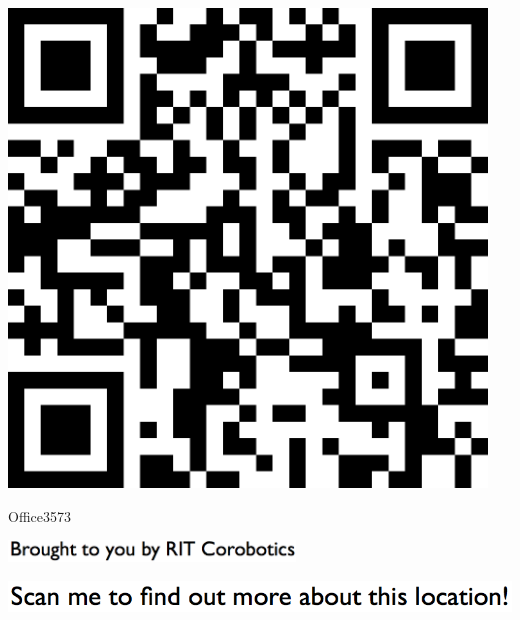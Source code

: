 \documentclass[letterpaper]{article}
\begin{document}
 \begingroup 
 \centerline{\includegraphics[scale=1,width=5in,height=5in]{Office3573.png}} 
 \endgroup 
 \vspace*{\fill} 

 \hfill{\small Office3573} 

  \vspace{0.7in} 
 
 \centerline{\includegraphics[scale=1,width=3in]{text-bottom.png}} 
 
 \pagebreak 
{} 
 \vspace*{\fill} 
 
  \centerline{\includegraphics[scale=1,width=6in]{text-top.png}} 
 
 \vspace{0.5in} 
 
\end{document}
